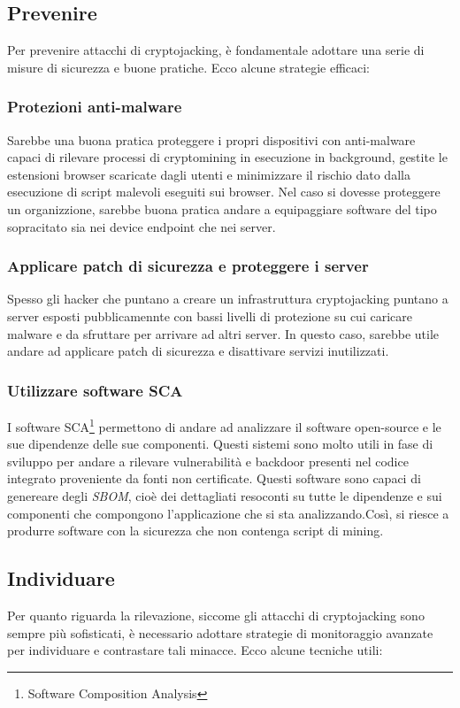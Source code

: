 \documentclass[12pt,a4paper]{article}
\begin{document}
\subsection{Prevenire}
Per prevenire attacchi di cryptojacking, è fondamentale adottare una serie di
misure di sicurezza e buone pratiche. Ecco alcune strategie efficaci:

\subsubsection{Protezioni anti-malware}
Sarebbe una buona pratica proteggere i propri dispositivi con anti-malware
capaci di rilevare processi di cryptomining in esecuzione in background, gestite
le estensioni browser scaricate dagli utenti e minimizzare il rischio dato dalla
esecuzione di script malevoli eseguiti sui browser. Nel caso si dovesse
proteggere un organizzione, sarebbe buona pratica andare a equipaggiare software
del tipo sopracitato sia nei device endpoint che nei server.

\subsubsection{Applicare patch di sicurezza e proteggere i server}
Spesso gli hacker che puntano a creare un infrastruttura cryptojacking puntano a
server esposti pubblicamennte con bassi livelli di protezione su cui caricare
malware e da sfruttare per arrivare ad altri server. In questo caso, sarebbe
utile andare ad applicare patch di sicurezza e disattivare servizi inutilizzati.

\subsubsection{Utilizzare software SCA}
I software SCA\footnote{Software Composition Analysis} permettono di andare ad
analizzare il software open-source e le sue dipendenze delle sue componenti.
Questi sistemi sono molto utili in fase di sviluppo per andare a rilevare
vulnerabilità e backdoor presenti nel codice integrato proveniente da fonti non
certificate. Questi software sono capaci di genereare degli \textit{SBOM}, cioè
dei dettagliati resoconti su tutte le dipendenze e sui componenti che compongono
l'applicazione che si sta analizzando.Così, si riesce a produrre software con la
sicurezza che non contenga script di mining.

\subsection{Individuare}
Per quanto riguarda la rilevazione, siccome gli attacchi di cryptojacking sono
sempre più sofisticati, è necessario adottare strategie di monitoraggio avanzate
per individuare e contrastare tali minacce. Ecco alcune tecniche utili:
\end{document}
